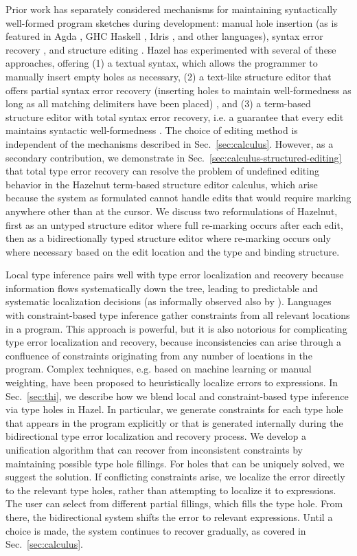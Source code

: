 Prior work has separately considered mechanisms for maintaining syntactically well-formed program sketches during development: manual hole insertion (as is featured in Agda \cite{agda}, GHC Haskell \cite{haskell-holes}, Idris \cite{idris-holes}, and other languages), syntax error recovery \cite{error-reovery}, and structure editing \cite{HazelnutPOPL}. 
Hazel has experimented with several of these approaches, offering (1) a textual syntax, which allows the programmer to manually insert empty holes as necessary, (2) a text-like structure editor that offers partial syntax error recovery (inserting holes to maintain well-formedness as long as all matching delimiters have been placed) \cite{tylr}, and (3) a term-based structure editor with total syntax error recovery, i.e. a guarantee that every edit maintains syntactic well-formedness \cite{HazelnutPOPL}. The choice of editing method is independent of the mechanisms described in Sec.~\ref{sec:calculus}. However, as a secondary contribution, 
we demonstrate in Sec.~\ref{sec:calculus-structured-editing} that total type error recovery can resolve the problem of undefined editing behavior in the Hazelnut term-based structure editor calculus, which arise because the system as formulated cannot handle edits that would require marking anywhere other than at the cursor. We discuss two reformulations of Hazelnut, first as an untyped structure editor where full re-marking occurs after each edit, then as a bidirectionally typed structure editor where re-marking occurs only where necessary based on the edit location and the type and binding structure.

Local type inference pairs well with type error localization and recovery because information flows systematically down the tree, leading to predictable and systematic localization decisions (as informally observed also by \cite{pierce}). Languages with constraint-based type inference gather constraints from all relevant locations in a program. This approach is powerful, but it is also notorious for complicating type error localization and recovery, because inconsistencies can arise through a confluence of constraints originating from any number of locations in the program. 
Complex techniques, e.g. based on machine learning or manual weighting, have been proposed to heuristically localize errors to expressions. 
In Sec.~\ref{sec:thi}, we describe how we blend local and constraint-based type inference via type holes in Hazel. In particular, 
we generate constraints for each type hole that appears in the program explicitly or that is  generated internally during the bidirectional type error localization and recovery process. 
We develop a unification algorithm that can recover from inconsistent constraints by maintaining possible type hole fillings. For holes that can be uniquely solved, we suggest the solution. 
If conflicting constraints arise, we localize the error directly to the relevant type holes, rather 
than attempting to localize it to expressions. 
The user can select from different partial fillings, which fills the type hole. From there, the bidirectional system shifts the error to relevant expressions.
Until a choice is made, the system continues to recover gradually, as covered in Sec.~\ref{sec:calculus}.



